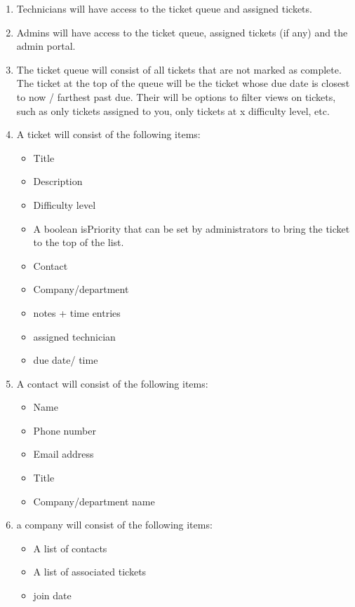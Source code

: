 \documentclass[letterpaper]{article}
\begin{document}
\begin{enumerate}
	\item Technicians will have access to the ticket queue and assigned tickets.
	\item Admins will have access to the ticket queue, assigned tickets (if any) and the admin portal.
	\item The ticket queue will consist of all tickets that are not marked as complete. The ticket at the top of the queue will be the ticket whose due date is closest to now / farthest past due. Their will be options to filter views on tickets, such as only tickets assigned to you, only tickets at x difficulty level, etc.
	\item A  ticket will consist of the following items:
	      \begin{itemize}
		      \item Title
		      \item Description
		      \item Difficulty level
		      \item A boolean isPriority that can be set by administrators to bring the ticket to the top of the list.
		      \item Contact
		      \item Company/department
		      \item notes + time entries
		      \item assigned technician
		      \item due date/ time
	      \end{itemize}
	\item A  contact will consist of the following items:
	      \begin{itemize}
		      \item Name
		      \item Phone number
		      \item Email address
		      \item Title
		      \item Company/department name
	      \end{itemize}
	\item a  company will consist of the following items:
	      \begin{itemize}
		      \item A list of contacts
		      \item A list of associated tickets
		      \item join date
	      \end{itemize}

\end{enumerate}
\end{document}
